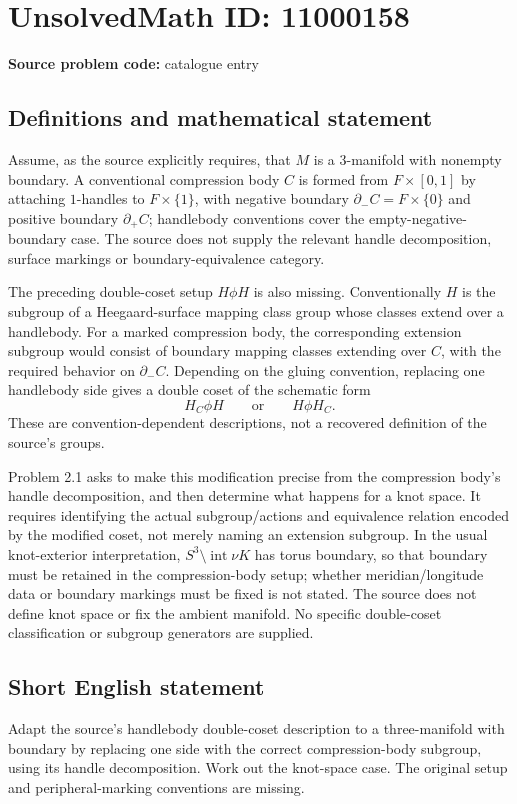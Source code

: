 \documentclass[11pt]{article}
\begin{document}
\section*{UnsolvedMath ID: 11000158}
\textbf{Source problem code:} catalogue entry
\subsection{Definitions and mathematical statement}
Assume, as the source explicitly requires, that \(M\) is a \(3\)-manifold with nonempty boundary. A conventional compression body \(C\) is formed from \(F\times[0,1]\) by attaching \(1\)-handles to \(F\times\{1\}\), with negative boundary \(\partial_-C=F\times\{0\}\) and positive boundary \(\partial_+C\); handlebody conventions cover the empty-negative-boundary case. The source does not supply the relevant handle decomposition, surface markings or boundary-equivalence category.

The preceding double-coset setup \(H\phi H\) is also missing. Conventionally \(H\) is the subgroup of a Heegaard-surface mapping class group whose classes extend over a handlebody. For a marked compression body, the corresponding extension subgroup would consist of boundary mapping classes extending over \(C\), with the required behavior on \(\partial_-C\). Depending on the gluing convention, replacing one handlebody side gives a double coset of the schematic form
\[
 H_C\phi H\qquad\text{or}\qquad H\phi H_C.
\]
These are convention-dependent descriptions, not a recovered definition of the source's groups.

Problem 2.1 asks to make this modification precise from the compression body's handle decomposition, and then determine what happens for a knot space. It requires identifying the actual subgroup/actions and equivalence relation encoded by the modified coset, not merely naming an extension subgroup. In the usual knot-exterior interpretation, \(S^3\setminus\operatorname{int}\nu K\) has torus boundary, so that boundary must be retained in the compression-body setup; whether meridian/longitude data or boundary markings must be fixed is not stated. The source does not define knot space or fix the ambient manifold. No specific double-coset classification or subgroup generators are supplied.
\subsection{Short English statement}
Adapt the source's handlebody double-coset description to a three-manifold with boundary by replacing one side with the correct compression-body subgroup, using its handle decomposition. Work out the knot-space case. The original setup and peripheral-marking conventions are missing.
\end{document}
